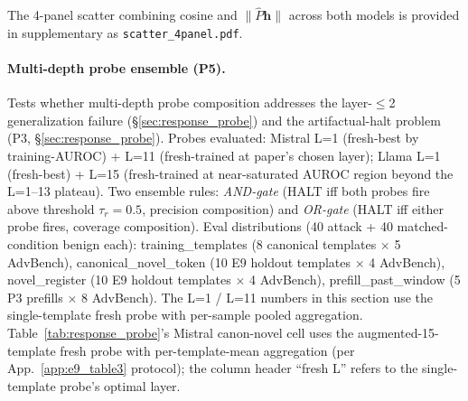 \documentclass{article}
\begin{document}
The 4-panel scatter combining cosine and $\|\hat{P}\mathbf{h}\|$ across both models is provided in supplementary as \texttt{scatter\_4panel.pdf}.

\paragraph{Multi-depth probe ensemble (P5).}
\label{app:p5_multidepth}
Tests whether multi-depth probe composition addresses the layer-$\leq$2 generalization failure (\S\ref{sec:response_probe}) and the artifactual-halt problem (P3, \S\ref{sec:response_probe}). Probes evaluated: Mistral L=1 (fresh-best by training-AUROC) + L=11 (fresh-trained at paper's chosen layer); Llama L=1 (fresh-best) + L=15 (fresh-trained at near-saturated AUROC region beyond the L=1--13 plateau). Two ensemble rules: \emph{AND-gate} (HALT iff both probes fire above threshold $\tau_r=0.5$, precision composition) and \emph{OR-gate} (HALT iff either probe fires, coverage composition). Eval distributions (40 attack + 40 matched-condition benign each): training\_templates (8 canonical templates $\times$ 5 AdvBench), canonical\_novel\_token (10 E9 holdout templates $\times$ 4 AdvBench), novel\_register (10 E9 holdout templates $\times$ 4 AdvBench), prefill\_past\_window (5 P3 prefills $\times$ 8 AdvBench). The L=1 / L=11 numbers in this section use the single-template fresh probe with per-sample pooled aggregation. Table~\ref{tab:response_probe}'s Mistral canon-novel cell uses the augmented-15-template fresh probe with per-template-mean aggregation (per App.~\ref{app:e9_table3} protocol); the column header ``fresh L'' refers to the single-template probe's optimal layer.
\end{document}
